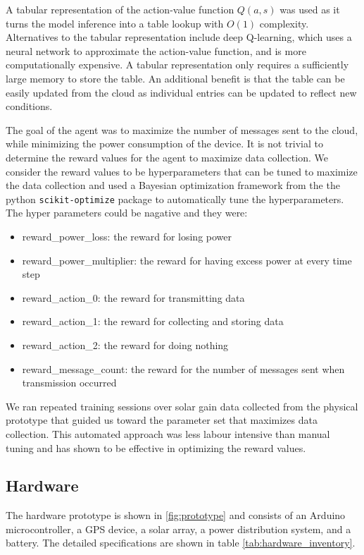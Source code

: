 \documentclass[10pt]{cai}
\begin{document}
A tabular representation of the action-value function $Q(a,s)$ was used as it turns the model inference into a table lookup with $O(1)$ complexity.
Alternatives to the tabular representation include deep Q-learning, which uses a neural network to approximate the action-value function, and is more computationally expensive.
A tabular representation only requires a sufficiently large memory to store the table.
An additional benefit is that the table can be easily updated from the cloud as individual entries can be updated to reflect new conditions.

The goal of the agent was to maximize the number of messages sent to the cloud, while minimizing the power consumption of the device.
It is not trivial to determine the reward values for the agent to maximize data collection.
We consider the reward values to be hyperparameters that can be tuned to maximize the data collection and used a Bayesian optimization framework from the the python \verb|scikit-optimize| package to automatically tune the hyperparameters.
The hyper parameters could be nagative and they were:
\begin{itemize}
  \item reward\_power\_loss: the reward for losing power
  \item reward\_power\_multiplier: the reward for having excess power at every time step
  \item reward\_action\_0: the reward for transmitting data
  \item reward\_action\_1: the reward for collecting and storing data
  \item reward\_action\_2: the reward for doing nothing
  \item reward\_message\_count: the reward for the number of messages sent when transmission occurred
\end{itemize}

We ran repeated training sessions over solar gain data collected from the physical prototype that guided us toward the parameter set that maximizes data collection.
This automated approach was less labour intensive than manual tuning and has shown to be effective in optimizing the reward values.

\subsection{Hardware}
The hardware prototype is shown in \ref{fig:prototype} and consists of an Arduino microcontroller, a GPS device,  a solar array, a power distribution system, and a battery.
The detailed specifications are shown in table \ref{tab:hardware_inventory}.
\end{document}
